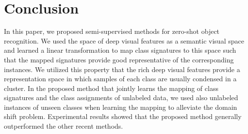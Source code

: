 \documentclass[10pt,twocolumn,letterpaper]{article}
\begin{document}
\section{Conclusion} \label{conclusion}
In this paper, we proposed semi-supervised methods for zero-shot object recognition. We used the space of deep visual features as a semantic visual space and learned a linear transformation to map class signatures to this space such that the mapped signatures provide good representative of the corresponding instances. We utilized this property that the rich deep visual features provide a representation space in which samples of each class are usually condensed in a cluster. In the proposed method that jointly learns the mapping of class signatures and the class assignments of unlabeled data, we used also unlabeled instances of unseen classes when learning the mapping to alleviate the domain shift problem. Experimental results showed that the proposed method generally outperformed the other recent methods.
{\small


}
\end{document}

